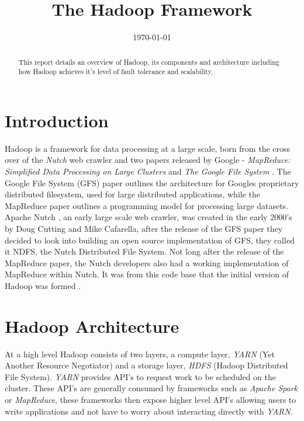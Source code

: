 \documentclass[conference]{IEEEtran}
\begin{document}
\title{The Hadoop Framework}

\author{
\today
}

\maketitle
\suppressfloats

\begin{abstract}
This report details an overview of Hadoop, its components and architecture including how Hadoop achieves it's level of fault tolerance and scalability.
\end{abstract}

\IEEEpeerreviewmaketitle



\section{Introduction}
Hadoop is a framework for data processing at a large scale, born from the cross over of the \emph{Nutch} web crawler and two papers 
released by Google - \emph{MapReduce: Simplified Data Processing on Large Clusters} \cite{mapreduce} and \emph{The Google File System} \cite{gfs}. 
The Google File System (GFS) paper outlines the architecture for Googles proprietary distributed filesystem, used for large distributed applications, while the MapReduce paper outlines a programming model for processing large datasets. Apache Nutch \cite{nutch}, an early large scale web crawler, was created in the early 2000's by Doug Cutting and Mike Cafarella, after the release of the GFS paper they decided to look into building an open source implementation of GFS, they called it NDFS, the Nutch Distributed File System. Not long after the release of the MapReduce paper, the Nutch developers also had a working implementation of MapReduce within Nutch. It was from this code base that the initial version of Hadoop was formed \cite{nutch2hadoop}.

\section{Hadoop Architecture}
At a high level Hadoop consists of two layers, a compute layer, \emph{YARN} (Yet Another Resource Negotiator) and a storage layer, \emph{HDFS} (Hadoop Distributed File System). \emph{YARN} provides API's to request work to be scheduled on the cluster. These API's are generally consumed by frameworks such as \emph{Apache Spark} or \emph{MapReduce}, these frameworks then expose higher level API's allowing users to write applications and not have to worry about interacting directly with \emph{YARN}.
\end{document}
